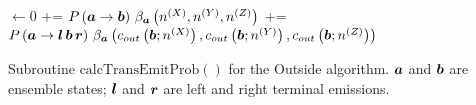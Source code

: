 \documentclass[10pt]{article}
\begin{document}
\begin{algorithm}[!ht]
  \SetLine

  \emitProb $\leftarrow 0$\;
   {
    \emitProb += $P \left( \boldsymbol{a} \to \boldsymbol{b} \right)\, \beta_{\boldsymbol{a}}\left( n^{(X)}, n^{(Y)}, n^{(Z)} \right)$\;
  }
   {
    \emitProb += $P \left( \boldsymbol{a} \to \boldsymbol{l}\,\boldsymbol{b}\,\boldsymbol{r} \right)\, \beta_{\boldsymbol{a}}\left( c_{out}\left(\boldsymbol{b}; n^{(X)}\right), c_{out}\left(\boldsymbol{b}; n^{(Y)}\right), c_{out}\left(\boldsymbol{b}; n^{(Z)}\right) \right)$\;
  }
  \KwRet{\emitProb}\;
  \caption{
    Subroutine $\mathrm{calcTransEmitProb}()$ for the Outside algorithm.
    $\boldsymbol{a}$ and $\boldsymbol{b}$ are ensemble states; $\boldsymbol{l}$ and $\boldsymbol{r}$ are left and right terminal emissions.
  }
\end{algorithm}
\end{document}

